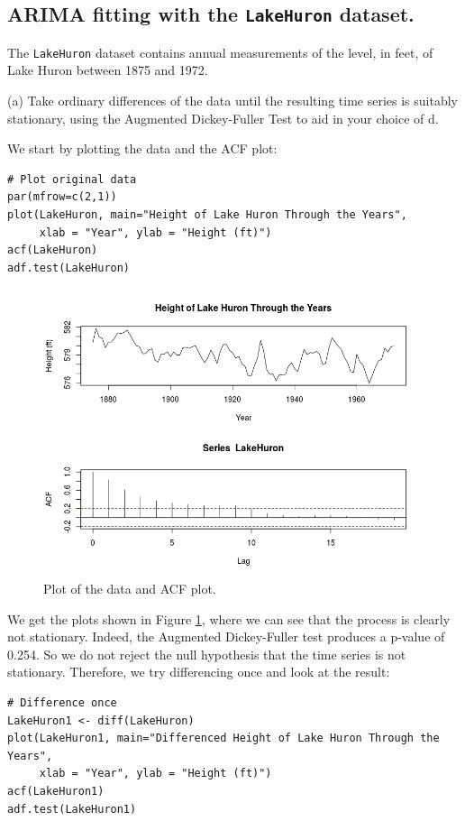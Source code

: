 \documentclass[]{article}
\begin{document}
\subsection{ARIMA fitting with the \texttt{LakeHuron} dataset.}
The \texttt{LakeHuron} dataset contains annual measurements of the level, in feet, of Lake Huron between 1875 and 1972.

(a) Take ordinary differences of the data until the resulting time series is suitably stationary, using the Augmented Dickey-Fuller Test to aid in your choice of d.

\color{blue}
We start by plotting the data and the ACF plot:

\begin{Verbatim}[frame=single]
# Plot original data
par(mfrow=c(2,1))
plot(LakeHuron, main="Height of Lake Huron Through the Years",
     xlab = "Year", ylab = "Height (ft)")
acf(LakeHuron)
adf.test(LakeHuron)
\end{Verbatim}

\begin{figure}[!ht]
\centering
\includegraphics[width=.8\textwidth]{huronplot.png}
\caption{Plot of the data and ACF plot.}
\label{huronplot}
\end{figure}


We get the plots shown in Figure \ref{huronplot}, where we can see that the process is clearly not stationary. Indeed, the Augmented Dickey-Fuller test produces a p-value of 0.254. So we do not reject the null hypothesis that the time series is not stationary. Therefore, we try differencing once and look at the result:

\begin{Verbatim}[frame=single]
# Difference once
LakeHuron1 <- diff(LakeHuron)
plot(LakeHuron1, main="Differenced Height of Lake Huron Through the Years",
     xlab = "Year", ylab = "Height (ft)")
acf(LakeHuron1)
adf.test(LakeHuron1)
\end{Verbatim}
\end{document}
